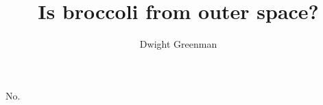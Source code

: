 \documentclass{gescons}
\title {Is broccoli from outer space?}
\author{Dwight Greenman}
\begin{document}

    \begin{multicols}{3}

        \lipsum[2-8]
        
        \lipsum[9-18]
        
        No.
    \end{multicols}
\end{document}
